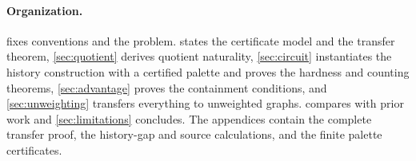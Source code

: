 \paragraph{Organization.}
 fixes conventions and the problem.  states the certificate model and the transfer theorem, \cref{sec:quotient} derives quotient naturality, \cref{sec:circuit} instantiates the history construction with a certified palette and proves the hardness and counting theorems, \cref{sec:advantage} proves the containment conditions, and \cref{sec:unweighting} transfers everything to unweighted graphs.  compares with prior work and \cref{sec:limitations} concludes. The appendices contain the complete transfer proof, the history-gap and source calculations, and the finite palette certificates.
